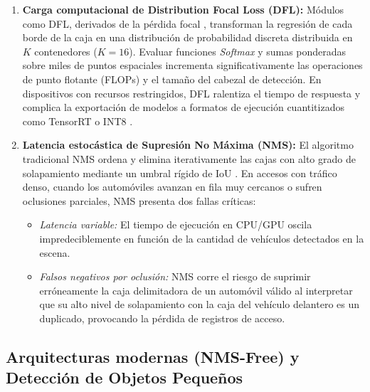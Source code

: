 \begin{enumerate}
    \item \textbf{Carga computacional de Distribution Focal Loss (DFL):} Módulos
        como DFL, derivados de la pérdida focal \cite{lin2017focal}, transforman
        la regresión de cada borde de la caja en una
        distribución de probabilidad discreta distribuida en $K$ contenedores
        ($K=16$). Evaluar funciones \textit{Softmax} y sumas ponderadas sobre
        miles de puntos espaciales incrementa significativamente las operaciones
        de punto flotante (FLOPs) y el tamaño del cabezal de detección. En
        dispositivos con recursos restringidos, DFL ralentiza el tiempo de
        respuesta y complica la exportación de modelos a formatos de ejecución
        cuantitizados como TensorRT o INT8 \cite{jocher2026yolo26}.
    
    \item \textbf{Latencia estocástica de Supresión No Máxima (NMS):} El
        algoritmo tradicional NMS ordena y elimina iterativamente las cajas con
        alto grado de solapamiento mediante un umbral rígido de IoU
        \cite{bodla2017softnms}. En accesos con tráfico denso, cuando los
        automóviles avanzan en fila muy cercanos o sufren oclusiones parciales,
        NMS presenta dos fallas críticas:

    \begin{itemize}
        \item \textit{Latencia variable:} El tiempo de ejecución en CPU/GPU
            oscila impredeciblemente en función de la cantidad de vehículos
            detectados en la escena.

        \item \textit{Falsos negativos por oclusión:} NMS corre el riesgo de
            suprimir erróneamente la caja delimitadora de un automóvil válido al
            interpretar que su alto nivel de solapamiento con la caja del
            vehículo delantero es un duplicado, provocando la pérdida de
            registros de acceso.
    \end{itemize}
\end{enumerate}

\subsection{Arquitecturas modernas (NMS-Free) y Detección de Objetos Pequeños}

